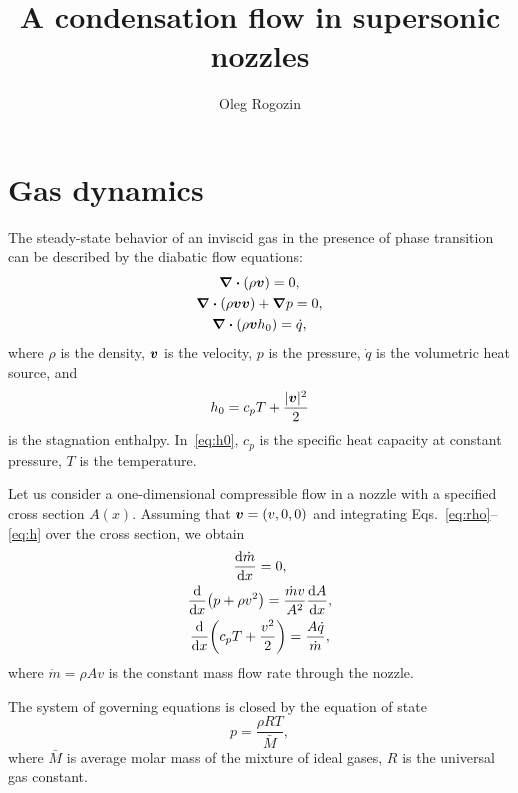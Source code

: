 \documentclass{article}
\title{A condensation flow in supersonic nozzles}
\author{Oleg Rogozin}
\newcommand{\bv}{\vb*{v}}
\begin{document}
\maketitle

\section{Gas dynamics}

The steady-state behavior of an inviscid gas in the presence of phase transition
can be described by the diabatic flow equations:
\begin{gather}
    \div(\rho\bv) = 0, \label{eq:rho}\\
    \div(\rho\bv\bv) + \grad{p} = 0, \label{eq:v}\\
    \div(\rho\bv h_0) = \dot{q}, \label{eq:h}
\end{gather}
where $\rho$ is the density, $\bv$ is the velocity, $p$ is the pressure,
$\dot{q}$ is the volumetric heat source, and
\begin{equation}\label{eq:h0}
    h_0 = c_pT + \frac{|\bv|^2}{2}
\end{equation}
is the stagnation enthalpy. In~\eqref{eq:h0},
$c_p$ is the specific heat capacity at constant pressure, $T$ is the temperature.

Let us consider a one-dimensional compressible flow in a nozzle with a specified cross section $A(x)$.
Assuming that $\bv = (v,0,0)$ and integrating Eqs.~\eqref{eq:rho}--\eqref{eq:h} over the cross section,
we obtain
\begin{gather}
    \dv{\dot{m}}{x} = 0, \label{eq:continuity}\\
    \dv{x}(p + \rho v^2) = \frac{\dot{m}v}{A^2}\dv{A}{x}, \label{eq:momentum}\\
    \dv{x}(c_pT + \frac{v^2}{2}) = \frac{A\dot{q}}{\dot{m}}, \label{eq:energy}
\end{gather}
where $\dot{m} = \rho Av$ is the constant mass flow rate through the nozzle.

The system of governing equations is closed by the equation of state
\begin{equation}\label{eq:eos}
    p = \frac{\rho RT}{\bar{M}},
\end{equation}
where $\bar{M}$ is average molar mass of the mixture of ideal gases,
$R$ is the universal gas constant.
\end{document}

